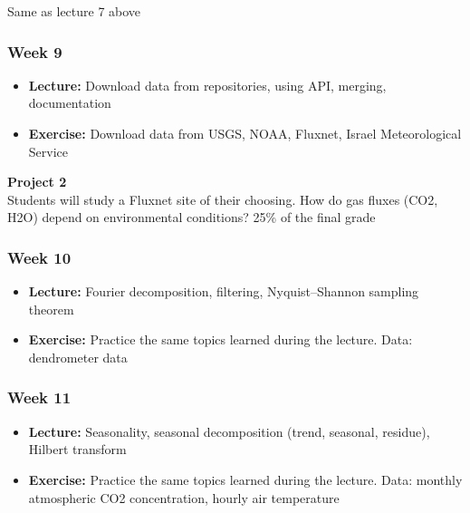 \documentclass[
  letterpaper,
  DIV=11,
  numbers=noendperiod,
  oneside]{scrreprt}
\providecommand{\tightlist}{%
  \setlength{\itemsep}{0pt}\setlength{\parskip}{0pt}}\usepackage{longtable,booktabs,array}
\begin{document}
Same as lecture 7 above

\hypertarget{week-9}{%
\subsubsection*{Week 9}\label{week-9}}

\begin{itemize}
\tightlist
\item
  \textbf{Lecture:} Download data from repositories, using API, merging,
  documentation
\item
  \textbf{Exercise:} Download data from USGS, NOAA, Fluxnet, Israel
  Meteorological Service
\end{itemize}

\textbf{Project 2}\\
Students will study a Fluxnet site of their choosing. How do gas fluxes
(CO2, H2O) depend on environmental conditions? 25\% of the final grade

\hypertarget{week-10}{%
\subsubsection*{Week 10}\label{week-10}}

\begin{itemize}
\tightlist
\item
  \textbf{Lecture:} Fourier decomposition, filtering, Nyquist--Shannon
  sampling theorem
\item
  \textbf{Exercise:} Practice the same topics learned during the
  lecture. Data: dendrometer data
\end{itemize}

\hypertarget{week-11}{%
\subsubsection*{Week 11}\label{week-11}}

\begin{itemize}
\tightlist
\item
  \textbf{Lecture:} Seasonality, seasonal decomposition (trend,
  seasonal, residue), Hilbert transform
\item
  \textbf{Exercise:} Practice the same topics learned during the
  lecture. Data: monthly atmospheric CO2 concentration, hourly air
  temperature
\end{itemize}
\end{document}
